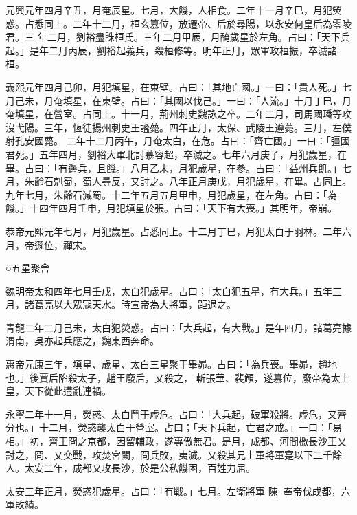 \begin{pinyinscope}
 元興元年四月辛丑，月奄辰星。七月，大饑，人相食。二年十一月辛巳，月犯熒惑。占悉同上。二年十二月，桓玄篡位，放遷帝、后於尋陽，以永安何皇后為零陵君。三
 年二月，劉裕盡誅桓氏。三年二月甲辰，月醃歲星於左角。占曰：「天下兵起。」是年二月丙辰，劉裕起義兵，殺桓修等。明年正月，眾軍攻桓振，卒滅諸桓。



 義熙元年四月己卯，月犯填星，在東壁。占曰：「其地亡國。」一曰：「貴人死。」七月己未，月奄填星，在東壁。占曰：「其國以伐己。」一曰：「人流。」十月丁巳，月奄填星，在營室。占同上。十一月，荊州刺史魏詠之卒。二年二月，司馬國璠等攻沒弋陽。三年，恆徒揚州刺史王謐薨。四年正月，太保、武陵王遵薨。三月，左僕射孔安國薨。
 二年十二月丙午，月奄太白，在危。占曰：「齊亡國。」一曰：「彊國君死。」五年四月，劉裕大軍北討慕容超，卒滅之。七年六月庚子，月犯歲星，在畢。占曰：「有邊兵，且饑。」八月乙未，月犯歲星，在參。占曰：「益州兵飢。」七月，朱齡石剋蜀，蜀人尋反，又討之。八年正月庚戌，月犯歲星，在畢。占同上。九年七月，朱齡石滅蜀。十二年五月五月甲申，月犯歲星，在左角。占曰：「為饑。」十四年四月壬申，月犯填星於張。占曰：「天下有大喪。」其明年，帝崩。



 恭帝元熙元年七月，月犯歲星。占悉同上。十二月丁巳，月犯太白于羽林。二年六月，帝遜位，禪宋。



 ○五星聚舍



 魏明帝太和四年七月壬戌，太白犯歲星。占曰；「太白犯五星，有大兵。」五年三月，諸葛亮以大眾寇天水。時宣帝為大將軍，距退之。



 青龍二年二月己未，太白犯熒惑。占曰：「大兵起，有大戰。」是年四月，諸葛亮據渭南，吳亦起兵應之，魏東西奔命。



 惠帝元康三年，填星、歲星、太白三星聚于畢昴。占曰：「為兵喪。畢昴，趙地也。」後賈后陷殺太子，趙王廢后，又殺之，
 斬張華、裴頠，遂篡位，廢帝為太上皇，天下從此遘亂連禍。



 永寧二年十一月，熒惑、太白鬥于虛危。占曰：「大兵起，破軍殺將。虛危，又齊分也。」十二月，熒惑襲太白于營室。占曰；「天下兵起，亡君之戒。」一曰：「易相。」初，齊王冏之京都，因留輔政，遂專傲無君。是月，成都、河間檄長沙王乂討之，冏、乂交戰，攻焚宮闕，冏兵敗，夷滅。又殺其兄上軍將軍寔以下二千餘人。太安二年，成都又攻長沙，於是公私饑困，百姓力屈。



 太安三年正月，熒惑犯歲星。占曰：「有戰。」七月。左衛將軍
 陳奉帝伐成都，六軍敗績。




\end{pinyinscope}
